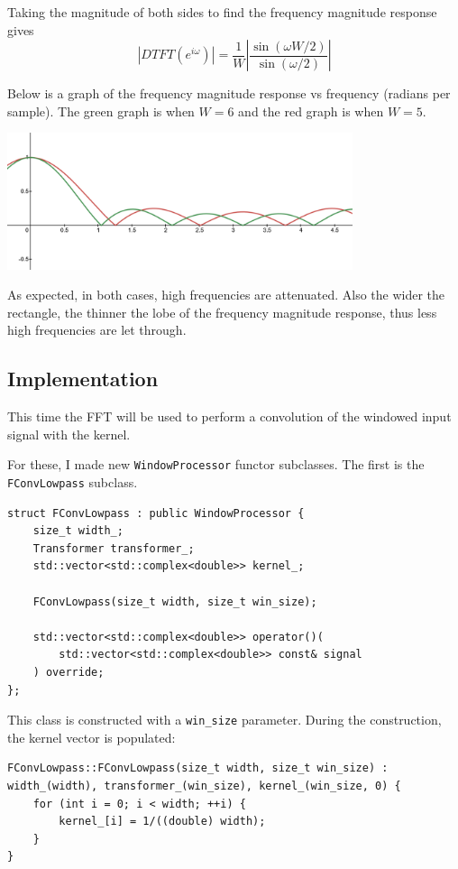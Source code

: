 Taking the magnitude of both sides to find the frequency magnitude response gives
$$|DTFT(e^{i\omega})|=\frac{1}{W}\left|\frac{\sin (\omega W /2)}{\sin (\omega /2)}\right|$$

Below is a graph of the frequency magnitude response vs frequency (radians per sample).
The green graph is when $W=6$ and the red graph is when $W=5$.
\begin{center}\includegraphics[height=4cm]{assets/rectangledtft.png}\end{center}

As expected, in both cases, high frequencies are attenuated.
Also the wider the rectangle, the thinner the lobe of the frequency magnitude response,
thus less high frequencies are let through.

\pagebreak

\subsection{Implementation}
This time the FFT will be used to perform a convolution of the windowed input signal
with the kernel.

For these, I made new \verb|WindowProcessor| functor subclasses.
The first is the \verb|FConvLowpass| subclass.

\begin{verbatim}
struct FConvLowpass : public WindowProcessor {
    size_t width_;
    Transformer transformer_;
    std::vector<std::complex<double>> kernel_;

    FConvLowpass(size_t width, size_t win_size);

    std::vector<std::complex<double>> operator()(
        std::vector<std::complex<double>> const& signal
    ) override;
};
\end{verbatim}

This class is constructed with a \verb|win_size| parameter.
During the construction, the kernel vector is populated:

\begin{verbatim}
FConvLowpass::FConvLowpass(size_t width, size_t win_size) : 
width_(width), transformer_(win_size), kernel_(win_size, 0) {
    for (int i = 0; i < width; ++i) {
        kernel_[i] = 1/((double) width);
    }
}
\end{verbatim}

